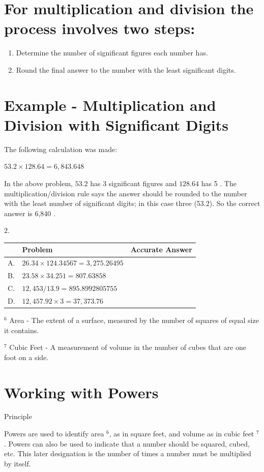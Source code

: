 \documentclass[10pt]{article}
\begin{document}
\section{For multiplication and division the process involves two steps:}
\begin{enumerate}
  \item Determine the number of significant figures each number has.

  \item Round the final answer to the number with the least significant digits.

\end{enumerate}
\section{Example - Multiplication and Division with Significant Digits}
The following calculation was made:

$53.2 \times 128.64=6,843.648$

In the above problem, $53.2$ has 3 significant figures and $128.64$ has 5 . The multiplication/division rule says the answer should be rounded to the number with the least number of significant digits; in this case three (53.2). So the correct answer is 6,840 .

$2 .$

\begin{tabular}{|l|l|l|}
\hline
 & Problem & Accurate Answer \\
\hline
A. & $26.34 \times 124.34567=3,275.26495$ &  \\
\hline
B. & $23.58 \times 34.251=807.63858$ &  \\
\hline
C. & $12,453 / 13.9=895.8992805755$ &  \\
\hline
D. & $12,457.92 \times 3=37,373.76$ &  \\
\hline
\end{tabular}

${ }^{6}$ Area - The extent of a surface, measured by the number of squares of equal size it contains.

${ }^{7}$ Cubic Feet - A measurement of volume in the number of cubes that are one foot on a side.

\section{Working with Powers}
Principle

Powers are used to identify area ${ }^{6}$, as in square feet, and volume as in cubic feet ${ }^{7}$. Powers can also be used to indicate that a number should be squared, cubed, etc. This later designation is the number of times a number must be multiplied by itself.
\end{document}
